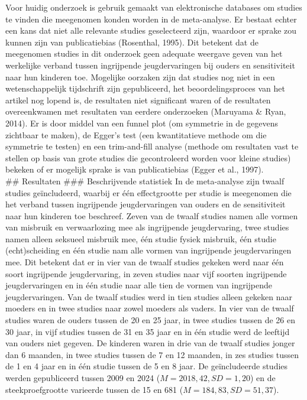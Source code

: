 \documentclass[12pt]{article}
\begin{document}
Voor huidig onderzoek is gebruik gemaakt van elektronische databases om
studies te vinden die meegenomen konden worden in de meta-analyse. Er
bestaat echter een kans dat niet alle relevante studies geselecteerd
zijn, waardoor er sprake zou kunnen zijn van publicatiebias (Rosenthal,
1995). Dit betekent dat de meegenomen studies in dit onderzoek geen
adequate weergave geven van het werkelijke verband tussen ingrijpende
jeugdervaringen bij ouders en sensitiviteit naar hun kinderen toe.
Mogelijke oorzaken zijn dat studies nog niet in een wetenschappelijk
tijdschrift zijn gepubliceerd, het beoordelingsproces van het artikel
nog lopend is, de resultaten niet significant waren of de resultaten
overeenkwamen met resultaten van eerdere onderzoeken (Maruyama \& Ryan,
2014). Er is door middel van een funnel plot (om symmetrie in de
gegevens zichtbaar te maken), de Egger's test (een kwantitatieve methode
om die symmetrie te testen) en een trim-and-fill analyse (methode om
resultaten vast te stellen op basis van grote studies die gecontroleerd
worden voor kleine studies) bekeken of er mogelijk sprake is van
publicatiebias (Egger et al., 1997).\\
\#\# Resultaten \#\#\# Beschrijvende statistiek In de meta-analyse zijn
twaalf studies geïncludeerd, waarbij er één effectgrootte per studie is
meegenomen die het verband tussen ingrijpende jeugdervaringen van ouders
en de sensitiviteit naar hun kinderen toe beschreef. Zeven van de twaalf
studies namen alle vormen van misbruik en verwaarlozing mee als
ingrijpende jeugdervaring, twee studies namen alleen seksueel misbruik
mee, één studie fysiek misbruik, één studie (echt)scheiding en één
studie nam alle vormen van ingrijpende jeugdervaringen mee. Dit betekent
dat er in vier van de twaalf studies gekeken werd naar één soort
ingrijpende jeugdervaring, in zeven studies naar vijf soorten
ingrijpende jeugdervaringen en in één studie naar alle tien de vormen
van ingrijpende jeugdervaringen. Van de twaalf studies werd in tien
studies alleen gekeken naar moeders en in twee studies naar zowel
moeders als vaders. In vier van de twaalf studies waren de ouders tussen
de 20 en 25 jaar, in twee studies tussen de 26 en 30 jaar, in vijf
studies tussen de 31 en 35 jaar en in één studie werd de leeftijd van
ouders niet gegeven. De kinderen waren in drie van de twaalf studies
jonger dan 6 maanden, in twee studies tussen de 7 en 12 maanden, in zes
studies tussen de 1 en 4 jaar en in één studie tussen de 5 en 8 jaar. De
geïncludeerde studies werden gepubliceerd tussen 2009 en 2024
(\(M = 2018,42, SD = 1,20\)) en de steekproefgrootte varieerde tussen de
15 en 681 (\(M = 184,83, SD = 51,37\)).
\end{document}
